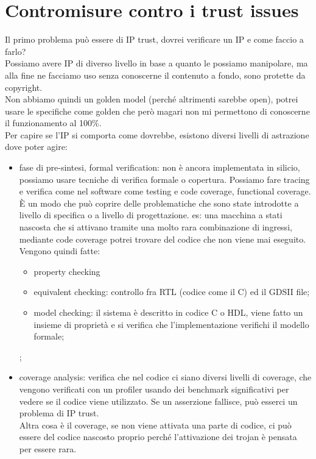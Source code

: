 \documentclass[oneside, 12pt]{extbook}
\begin{document}
\section{Contromisure contro i trust issues}
Il primo problema può essere di IP trust, dovrei verificare un IP e come faccio a farlo?\\Possiamo avere IP di diverso livello in base a quanto le possiamo manipolare, ma alla fine ne facciamo uso senza conoscerne il contenuto a fondo, sono protette da copyright.\\Non abbiamo quindi un golden model (perché altrimenti sarebbe open), potrei usare le specifiche come golden che però magari non mi permettono di conoscerne il funzionamento al 100\%.\\Per capire se l'IP si comporta come dovrebbe, esistono diversi livelli di astrazione dove poter agire:
\begin{itemize}
	\item fase di pre-sintesi, formal verification: non è ancora implementata in silicio, possiamo usare tecniche di verifica formale o copertura. Possiamo fare tracing e verifica come nel software come testing e code coverage, functional coverage. È un modo che può coprire delle problematiche che sono state introdotte a livello di specifica o a livello di progettazione. es: una macchina a stati nascosta che si attivano tramite una molto rara combinazione di ingressi, mediante code coverage potrei trovare del codice che non viene mai eseguito. Vengono quindi fatte:
	\begin{itemize}
		\item property checking
		\item equivalent checking: controllo fra RTL (codice come il C) ed il GDSII file;
		\item model checking: il sistema è descritto in codice C o HDL, viene fatto un insieme di proprietà e si verifica che l'implementazione verifichi il modello formale;
	\end{itemize};
	\item coverage analysis: verifica che nel codice ci siano diversi livelli di coverage, che vengono verificati con un profiler usando dei benchmark significativi per vedere se il codice viene utilizzato. Se un asserzione fallisce, può esserci un problema di IP trust.\\Altra cosa è il coverage, se non viene attivata una parte di codice, ci può essere del codice nascosto proprio perché l'attivazione dei trojan è pensata per essere rara.
\end{itemize}
\end{document}
